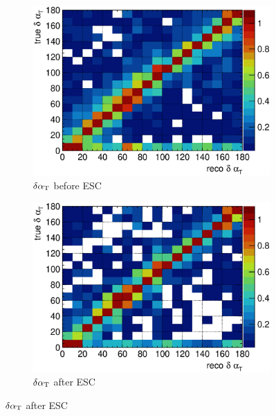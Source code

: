      \begin{figure}
     \centering
          \begin{subfigure}[b]{\dbfigwid\textwidth}
               \centering
               \includegraphics[width=\textwidth]{figures/perf/tki/dalphat_colnor_resmat_al10_sfgmu.eps}
               \caption{$\delta\alpha_\textrm{T}$ before ESC}
               \label{subfig:esc-dalpha-bfesc-sfgmu}
          \end{subfigure}         
          \begin{subfigure}[b]{\dbfigwid\textwidth}
               \centering
               \includegraphics[width=\textwidth]{figures/perf/tki/dalphat_colnor_resmat_al11_sfgmu.eps}
               \caption{$\delta\alpha_\textrm{T}$ after ESC}
               \label{subfig:esc-dalpha-afesc-sfgmu}
          \end{subfigure}

\end{figure}
